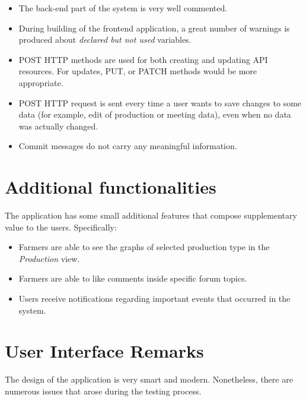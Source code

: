 \begin{itemize}
    \item The back-end part of the system is very well commented.
    \item During building of the frontend application, a great number of warnings is produced about \textit{declared but not used} variables.
    \item POST HTTP methods are used for both creating and updating API resources. For updates, PUT, or PATCH methods would be more appropriate. 
    \item POST HTTP request is sent every time a user wants to save changes to some data (for example, edit of production or meeting data), even when no data was actually changed.
    \item Commit messages do not carry any meaningful information.
\end{itemize}


\section{Additional functionalities}

The application has some small additional features that compose supplementary value to the users. Specifically:
\begin{itemize}
    \item Farmers are able to see the graphs of selected production type in the \textit{Production} view.
    \item Farmers are able to like comments inside specific forum topics.
    \item Users receive notifications regarding important events that occurred in the system.
\end{itemize}

\section{User Interface Remarks}

The design of the application is very smart and modern. Nonetheless, there are numerous issues that arose during the testing process.

